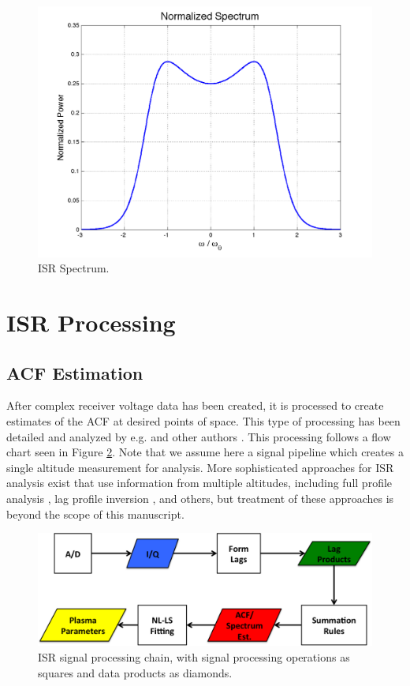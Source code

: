 \begin{figure}[!t]
\centering
\includegraphics[width=6in]{ionlinespec}
\caption{ISR Spectrum.}
\label{fig:ispecch2}
\end{figure}

\section{ISR Processing}

\subsection{ACF Estimation}
After complex receiver voltage data has been created, it is processed to create estimates of the ACF at desired points of space. This type of processing has been detailed and analyzed by e.g. \cite{farley1969} and other authors \cite{nygren1996}. This processing follows a flow chart seen in Figure \ref{fig:chain}.  Note that we assume here a signal pipeline which creates a single altitude measurement for analysis.  More sophisticated approaches for ISR analysis exist that use information from multiple altitudes, including full profile analysis \cite{RDS:RDS3308}, lag profile inversion \cite{Virtanen:20082vx}, and others, but treatment of these approaches is beyond the scope of this manuscript.

\begin{figure}[!t]
\centering
\includegraphics[width=6in]{datastackchain}
\caption{ISR signal processing chain, with signal processing operations as squares and data products as diamonds.}
\label{fig:chain}
\end{figure}


